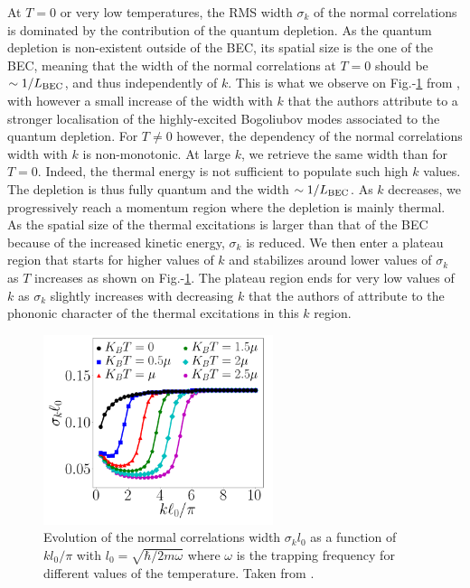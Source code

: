 At $T=0$ or very low temperatures, the RMS width $\sigma_k$ of the normal correlations is dominated by the contribution of the quantum depletion. As the quantum depletion is non-existent outside of the BEC, its spatial size is the one of the BEC, meaning that the width of the normal correlations at $T=0$ should be $\sim 1/L_{\rm{BEC}}$, and thus independently of $k$. This is what we observe on Fig.-\ref{fig:butera_kk} from \cite{butera2020}, with however a small increase of the width with $k$ that the authors attribute to a stronger localisation of the highly-excited Bogoliubov modes associated to the quantum depletion.
For $T \neq 0$ however, the dependency of the normal correlations width with $k$ is non-monotonic. At large $k$, we retrieve the same width than for $T=0$. Indeed, the thermal energy is not sufficient to populate such high $k$ values. The depletion is thus fully quantum and the width $\sim 1/L_{\rm{BEC}}$. As $k$ decreases, we progressively reach a momentum region where the depletion is mainly thermal. As the spatial size of the thermal excitations is larger than that of the BEC because of the increased kinetic energy, $\sigma_k$ is reduced. We then enter a plateau region that starts for higher values of $k$ and stabilizes around lower values of $\sigma_k$ as $T$ increases as shown on Fig.-\ref{fig:butera_kk}. The plateau region ends for very low values of $k$ as $\sigma_k$ slightly increases with decreasing $k$ that the authors of \cite{butera2020} attribute to the phononic character of the thermal excitations in this $k$ region.


\begin{figure}
    \centering
    \includegraphics[width=0.6\textwidth]{Fig/Chapter1/butera.png}
    \caption[Evolution of the normal correlations width with $k$ for different values of the temperature]{Evolution of the normal correlations width $\sigma_k l_0$ as a function of $k l_0/\pi$ with $l_0=\sqrt{\hbar/2m \omega}$ where $\omega$ is the trapping frequency for different values of the temperature. Taken from \cite{butera2020}.}
    \label{fig:butera_kk}
\end{figure}

